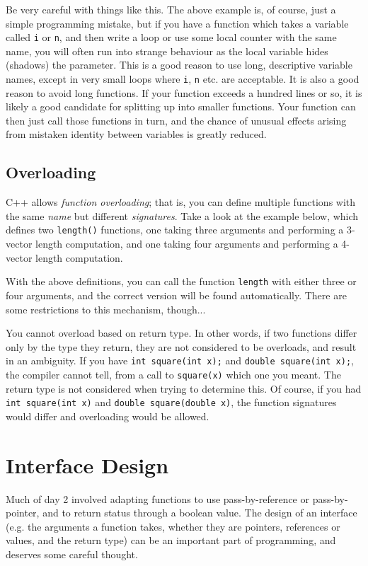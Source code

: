 \documentclass[a4paper]{scrartcl}
\begin{document}
Be very careful with things like this. The above example is, of course, just a simple programming mistake, but if you have a function which takes a variable called \verb|i| or \verb|n|, and then write a loop or use some local counter with the same name, you will often run into strange behaviour as the local variable hides (shadows) the parameter. This is a good reason to use long, descriptive variable names, except in very small loops where \verb|i|, \verb|n| etc. are acceptable. It is also a good reason to avoid long functions. If your function exceeds a hundred lines or so, it is likely a good candidate for splitting up into smaller functions. Your function can then just call those functions in turn, and the chance of unusual effects arising from mistaken identity between variables is greatly reduced.

\subsection{Overloading}
C++ allows \emph{function overloading}; that is, you can define multiple functions with the same \emph{name} but different \emph{signatures}. Take a look at the example below, which defines two \verb|length()| functions, one taking three arguments and performing a 3-vector length computation, and one taking four arguments and performing a 4-vector length computation.



With the above definitions, you can call the function \verb|length| with either three or four arguments, and the correct version will be found automatically. There are some restrictions to this mechanism, though...

You cannot overload based on return type. In other words, if two functions differ only by the type they return, they are not considered to be overloads, and result in an ambiguity. If you have \verb|int square(int x);| and \verb|double square(int x);|, the compiler cannot tell, from a call to \verb|square(x)| which one you meant. The return type is not considered when trying to determine this. Of course, if you had \verb|int square(int x)| and \verb|double square(double x)|, the function signatures would differ and overloading would be allowed.

\section{Interface Design}
Much of day 2 involved adapting functions to use pass-by-reference or pass-by-pointer, and to return status through a boolean value. The design of an interface (e.g. the arguments a function takes, whether they are pointers, references or values, and the return type) can be an important part of programming, and deserves some careful thought.
\end{document}

